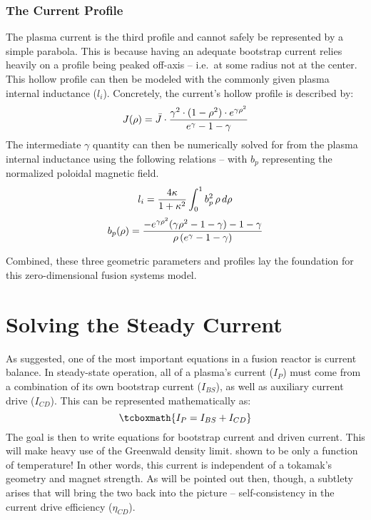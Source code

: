 \subsubsection{The Current  Profile}

The plasma current  is the third profile and cannot safely be represented by a simple parabola. This is because having an adequate bootstrap current relies heavily on a profile being peaked off-axis -- i.e.\ at some radius not at the center. This hollow profile can then be modeled with the commonly given plasma internal inductance ($l_i$). Concretely, the current's hollow profile is described by:
\begin{equation}
	J(\rho) = \bar{J} \cdot \frac{ \gamma ^ 2 \cdot ( 1 - \rho ^ 2 ) \cdot e^{ \gamma \rho^2 } }{ e^\gamma - 1 - \gamma}
	\myequations{Current Density Profile -- $J$}
\end{equation}
The intermediate $\gamma$ quantity can then be numerically solved for from the plasma internal inductance using the following relations -- with $b_p$ representing the normalized poloidal magnetic field. 
\begin{equation}
	l_i = \frac{4 \kappa}{1+\kappa^2}	 \int_0^1 b_p^2 \, \rho \, d\rho
	\myequations{Internal Inductance -- $l_i$}
\end{equation}
\begin{equation}
	\label{eq:b_p}
	b_p(\rho) = \frac{ -e^{\gamma\rho^2} ( \gamma\rho^2 - 1 - \gamma ) - 1 - \gamma }{\rho \,( e^\gamma - 1 - \gamma ) }
	\myequations{Normalized Poloidal Magnetic Field -- $b_p$}
\end{equation}

Combined, these three geometric parameters and profiles lay the foundation for this zero-dimensional fusion systems model.

\section{Solving the Steady Current}

As suggested, one of the most important equations in a fusion reactor is current balance. In steady-state operation, all of a plasma's current ($I_P$) must come from a combination of its own bootstrap current ($I_{BS}$), as well as auxiliary current drive ($I_{CD}$). This can be represented mathematically as:
\begin{equation}
	\label{eq:ibal}
	\tcboxmath{
	I_P = I_{BS} + I_{CD}
	}
	\myequations{Current Balance -- $I$}
\end{equation}
The goal is then to write equations for bootstrap current and driven current. This will make heavy use of the Greenwald density limit.  shown to be only a function of temperature! In other words, this current is independent of a tokamak's geometry and magnet strength. As will be pointed out then, though, a subtlety arises that will bring the two back into the picture -- self-consistency in the current drive efficiency ($\eta_{CD}$).

